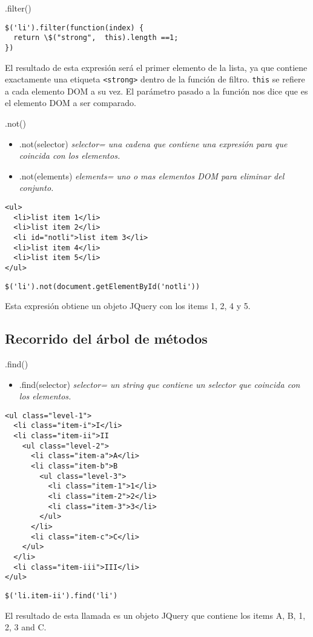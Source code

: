 \begin{frame}[fragile]{.filter()} %
\begin{lstlisting}
$('li').filter(function(index) {
  return \$("strong",  this).length ==1;
})
\end{lstlisting}
El resultado de esta expresión será el primer elemento de la lista, ya que
contiene exactamente una etiqueta \texttt{<strong>} dentro de la función de
filtro. \texttt{this} se refiere a cada elemento DOM a su vez. El parámetro
pasado a la función nos dice que es el elemento DOM a ser comparado.
\end{frame}

\begin{frame}[fragile]{.not()} %
\begin{itemize}
    \item .not(selector) \textit{ selector= una cadena que contiene una
    expresión para que coincida con los elementos.}
    \item .not(elements) \textit{ elements= uno o mas elementos DOM para
    eliminar del conjunto.}
\end{itemize}
\begin{lstlisting}
<ul>
  <li>list item 1</li>
  <li>list item 2</li>
  <li id="notli">list item 3</li>
  <li>list item 4</li>
  <li>list item 5</li>
</ul>
\end{lstlisting}
\begin{lstlisting}
$('li').not(document.getElementById('notli'))
\end{lstlisting}
Esta expresión obtiene un objeto JQuery con los items 1, 2, 4 y 5.
\end{frame}

\subsection{Recorrido del árbol de métodos} %

\begin{frame}[fragile]{.find()} %
\begin{itemize}
    \item .find(selector) \textit{ selector= un string que contiene un selector
    que coincida con los elementos.}
\end{itemize}
\begin{lstlisting}
<ul class="level-1">
  <li class="item-i">I</li>
  <li class="item-ii">II
    <ul class="level-2">
      <li class="item-a">A</li>
      <li class="item-b">B
        <ul class="level-3">
          <li class="item-1">1</li>
          <li class="item-2">2</li>
          <li class="item-3">3</li>
        </ul>
      </li>
      <li class="item-c">C</li>
    </ul>
  </li>
  <li class="item-iii">III</li>
</ul>
\end{lstlisting}
\begin{lstlisting}
$('li.item-ii').find('li')
\end{lstlisting}
El resultado de esta llamada es un objeto JQuery que contiene los items A, B, 1, 2, 3 and C.\\[0.9cm] 
\end{frame}

